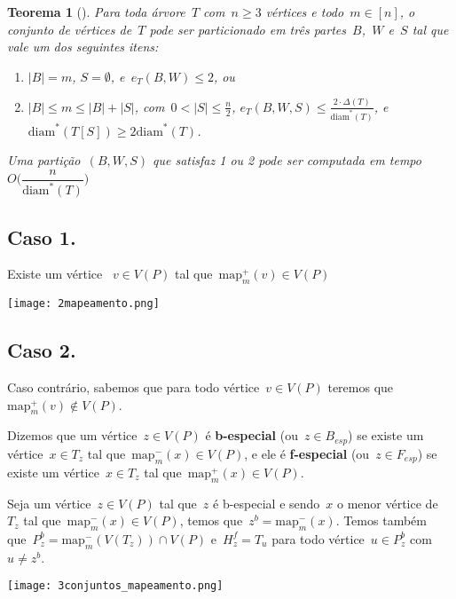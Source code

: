 \documentclass[a0,portrait]{a0poster}
\newtheorem{teo}{Teorema}
\newcommand{\diam}{\mathrm{diam}}
\newcommand{\map}{\mathrm{map}}
\begin{document}
\begin{multicols}{3}
\begin{teo}[]
    Para toda árvore~$T$ com~${n\ge 3}$ vértices e 
    todo~${m\in [n]}$,
    o conjunto de vértices de~$T$ pode ser particionado em 
    três partes~$B$,~$W$ e~$S$ tal que vale um dos 
    seguintes itens:
    \begin{enumerate}
    \item ${|B|=m}$, ${S=\emptyset}$, e~${e_T(B,W)\le 2}$, ou
    \item ${|B|\le m\le |B|+|S|}$, 
    com~${0<|S|\le\frac{n}{2}}$,
    ${e_T(B,W,S)\le \frac{2\cdot 
    \Delta(T)}{\diam^*(T)}}$, 
    e~${\diam^*(T[S])\ge 2\diam^*(T)}$.
    \end{enumerate}
    Uma partição~$(B,W,S)$ que satisfaz 1 ou 2 pode ser
    computada em tempo~${O\Big(\dfrac{n}{\diam^*(T)}\Big)}$ 
\end{teo}


\subsection*{Caso 1.}
    Existe um vértice ~${v\in V(P)}$ tal 
    que~${\map_m^+(v)\in V(P)}$
\begin{center}
\texttt{[image: 2mapeamento.png]}
\end{center}

\subsection*{Caso 2.}
    Caso contrário, sabemos que para todo vértice~${v\in V(P)}$
    teremos que~${\map_m^+(v)\not\in V(P)}$.

    Dizemos que um vértice~${z\in V(P)}$ é \textbf{b-especial}
    (ou~${z\in B_{esp}}$)
    se existe um vértice~${x\in T_z}$ tal 
    que~${\map^{-}_m(x)\in V(P)}$, e ele é
    \textbf{f-especial} (ou~${z\in F_{esp}}$) 
    se existe um vértice~${x\in T_z}$
    tal que~${\map^{+}_m(x)\in V(P)}$.

    \bigskip
    \bigskip

    Seja um vértice~${z\in V(P)}$ tal que~$z$ é b-especial e
    sendo~$x$ o menor vértice de~$T_z$ tal 
    que~${\map^-_m(x)\in V(P)}$, temos 
    que~${z^b = \map^-_m(x)}$.
    Temos também
    que~${P_z^b = \map^-_m(V(T_z))\cap V(P)}$
    e~${H_z^f =T_u}$ para todo 
    vértice~${u\in P_z^b}$ com~${u\ne z^b}$.

    \begin{center}
\texttt{[image: 3conjuntos\_mapeamento.png]}
\end{center}


\end{multicols}
\end{document}
